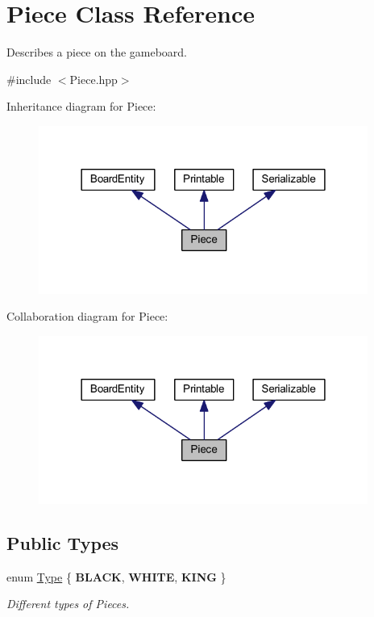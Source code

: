 \hypertarget{class_piece}{\section{Piece Class Reference}
\label{class_piece}
}


Describes a piece on the gameboard.  




{\ttfamily \#include $<$Piece.\-hpp$>$}



Inheritance diagram for Piece\-:\nopagebreak
\begin{figure}[H]
\begin{center}
\leavevmode
\includegraphics[width=306pt]{class_piece__inherit__graph}
\end{center}
\end{figure}


Collaboration diagram for Piece\-:\nopagebreak
\begin{figure}[H]
\begin{center}
\leavevmode
\includegraphics[width=306pt]{class_piece__coll__graph}
\end{center}
\end{figure}
\subsection*{Public Types}
\begin{DoxyCompactItemize}
\item 
enum \hyperlink{class_piece_abcd044975b3657962abfd2ded9194b09}{Type} \{ {\bfseries B\-L\-A\-C\-K}, 
{\bfseries W\-H\-I\-T\-E}, 
{\bfseries K\-I\-N\-G}
 \}
\begin{DoxyCompactList}\small\item\em Different types of Pieces. \end{DoxyCompactList}\end{DoxyCompactItemize}
